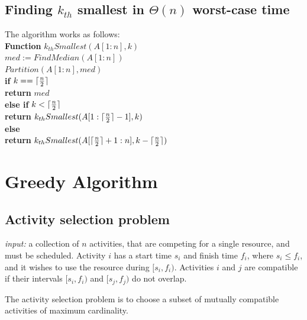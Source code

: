 \documentclass[11pt]{article}
\DeclarePairedDelimiter\ceil{\lceil}{\rceil}
\begin{document}
\subsection{Finding $k_{th}$ smallest in $\Theta(n)$ worst-case time}

The algorithm works as follows:\\

\textbf{Function} $k_{th}Smallest(A[1:n], k)$\\
\-\hspace{3em} $med := FindMedian(A[1:n])$\\
\-\hspace{3em} $Partition(A[1:n], med)$\\
\-\hspace{3em} \textbf{if} $k == \ceil{\frac{n}{2}}$\\
\-\hspace{5em} \textbf{return} $med$\\
\-\hspace{3em} \textbf{else if} $k < \ceil{\frac{n}{2}}$\\
\-\hspace{5em} \textbf{return}
$k_{th}Smallest(A[1:\ceil{\frac{n}{2}}-1], k)$\\
\-\hspace{3em} \textbf{else}\\
\-\hspace{5em} \textbf{return}
$k_{th}Smallest(A[\ceil{\frac{n}{2}}+1:n], k-\ceil{\frac{n}{2}})$\\


\section{Greedy Algorithm}
\subsection{Activity selection problem}

\emph{input:} a collection of $n$ activities, that are competing for a
single resource, and must be scheduled. Activity $i$ has a start time
$s_i$ and finish time $f_i$, where $s_i \leq f_i$, and it wishes to
use the resource during $[s_i, f_i)$. Activities $i$ and $j$ are
compatible if their intervals $[s_i, f_i)$ and $[s_j, f_j)$ do not
overlap. 

The activity selection problem is to choose a subset of mutually
compatible activities of maximum cardinality. \\
\end{document}
